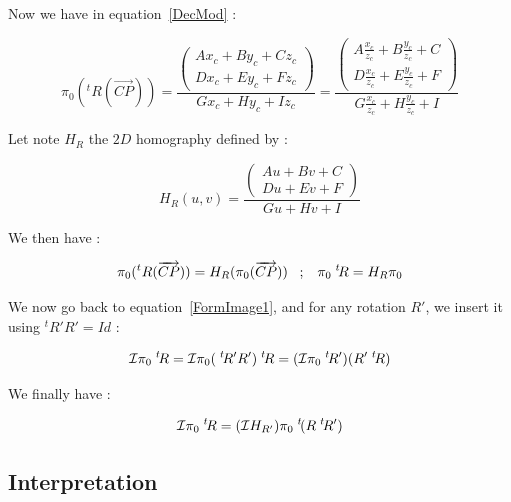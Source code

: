 Now we have in equation~\ref{DecMod} :

\begin{equation}
	\pi_0(^t R(\overrightarrow{CP})) 
	=  \frac{\begin{pmatrix} Ax_c+By_c+Cz_c \\ Dx_c+Ey_c+Fz_c  \end{pmatrix}}{Gx_c+Hy_c+Iz_c}
		=  \frac{\begin{pmatrix} A\frac{x_c}{z_c}+B\frac{y_c}{z_c}+C \\  D\frac{x_c}{z_c}+E\frac{y_c}{z_c}+F  \end{pmatrix}}
			{G\frac{x_c}{z_c}+H\frac{y_c}{z_c}+I}
\end{equation}

Let note $H_R$ the $2D$  homography defined by :

\begin{equation}
 H_R(u,v) =  \frac{\begin{pmatrix} Au+Bv+C \\  Du+Ev+F  \end{pmatrix}} {Gu+Hv+I}
\end{equation}

We then have :

\begin{equation}
	\pi_0(^t R(\overrightarrow{CP}))  = H_R  (\pi_0 (\overrightarrow{CP}))
\;\;\;  ;  \;\;\;
        \pi_0  \; ^{t} \!  R = H_R  \pi_0
	\label{RotHomog}
\end{equation}

We now go back to equation~\ref{FormImage1}, and for any rotation $R'$, we insert it using $^t R'R'=Id$ :

\begin{equation}
	\mathcal{I} \pi_0   \; ^{t} \! R = \mathcal{I}  \pi_0   (\; ^{t} \! R' R')  \; ^{t} \! R = ( \mathcal{I}  \pi_0   \; ^{t} \! R')  (R' \; ^{t} \! R )
\end{equation}

We finally have :

\begin{equation}
	   \mathcal{I} \pi_0   \; ^{t} \! R 
	   = (\mathcal{I} H_{R'})   \pi_0   \; ^{t} \! (R \; ^{t} \! R')  \label{FormRotCalib}
\end{equation}



\subsection{Interpretation}

